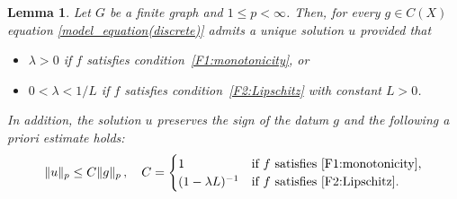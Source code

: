 \documentclass[journal]{article}
\theoremstyle{nonitalic}
\theoremstyle{nonitalic}
\theoremstyle{plain} %
\newtheorem{lemma}[theorem]{Lemma}
\numberwithin{equation}{section}
\begin{document}
\begin{lemma}\label{lem:bijective-sign-norm}
Let $G$ be a finite graph and $1\leq p<\infty$. Then, for every $g\in C(X)$ equation \eqref{model_equation(discrete)}
admits a unique solution $u$ provided that
\begin{itemize}
    \item $\lambda > 0$ if $f$ satisfies condition~\textnormal{\ref{F1:monotonicity}}, or
    \item $0 < \lambda < 1/L$ if $f$ satisfies condition~\textnormal{\ref{F2:Lipschitz}} with constant $L>0$.
\end{itemize}
In addition, the solution $u$ preserves the sign of the datum $g$ and  the following a priori estimate holds:
\begin{equation}\label{apriori}
    \|u\|_p \leq C\|g\|_p \, ,\quad C = \begin{cases}
        1 &\mbox{if } f \mbox{ satisfies } \textnormal{\ref{F1:monotonicity}},\\
        (1-\lambda L)^{-1}  &\mbox{if } f \mbox{ satisfies } \textnormal{\ref{F2:Lipschitz}}.
    \end{cases}
\end{equation}
\end{lemma}
\end{document}
